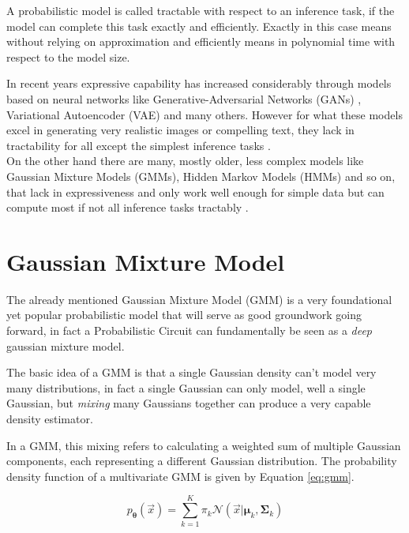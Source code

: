 \begin{definition}[Tractability]
    A probabilistic model is called tractable with respect to an inference task, if the model can complete this 
    task exactly and efficiently. Exactly in this case means without relying on approximation and efficiently 
    means in polynomial time with respect to the model size. \cite{pc_intro}
\end{definition}

In recent years expressive capability has increased considerably through models based on neural networks like Generative-Adversarial
Networks (GANs) \cite{gan}, Variational Autoencoder (VAE) \cite{vae} and many others. However for what these models excel in generating 
very realistic images or compelling text, they lack in tractability for all except the simplest inference tasks
\cite{pc_intro}. \\

On the other hand there are many, mostly older, less complex models like Gaussian Mixture Models (GMMs), Hidden Markov Models (HMMs) and so on, 
that lack in expressiveness and only work well enough for simple data but can compute most if not all inference tasks tractably \cite{ml_book}.

\section{Gaussian Mixture Model}
\label{sec:gmm}

The already mentioned Gaussian Mixture Model (GMM) \cite{ml_book} is a very foundational yet popular probabilistic model that will serve as good groundwork 
going forward, in fact a Probabilistic Circuit can fundamentally be seen as a \emph{deep} gaussian mixture model. 

The basic idea of a GMM is that a single Gaussian density can't model very many distributions, in fact a single Gaussian 
can only model, well a single Gaussian, but \emph{mixing} many Gaussians together can produce a very capable density estimator. 

In a GMM, this mixing refers to calculating a weighted sum of multiple Gaussian components, each representing a different Gaussian distribution. 
The probability density function of a multivariate GMM is given by Equation \ref{eq:gmm}.

\begin{equation}
    p_{\boldsymbol{\theta}}(\vec x) =  \sum_{k=1}^K \pi_k \mathcal{N}(\vec x|\boldsymbol{\mu}_k, \boldsymbol{\Sigma}_k) 
    \label{eq:gmm}
\end{equation}

